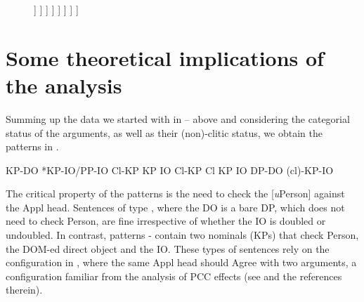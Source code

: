 \documentclass[output=paper,colorlinks,citecolor=brown,nonflat]{./langscibook}
\begin{document}
\begin{figure}%
	\begin{forest}
		[PersP
			[Pers
			]
			[\textit{v}P
				[KP\textsubscript{Theme}
				]
				[\textit{v}P
					[DP\textsubscript{Agent}
					]
					[\textit{v}'
						[\textit{v}
						]
						[V\textsubscript{Appl}P
								[KP\textsubscript{Theme}
								]
								[V'\textsubscript{Appl}
									[V\textsubscript{Appl}
									]
									[VP
										[KP\textsubscript{Goal}
										]
									]
								]
						]
						]
					]
				]
			]
		]
	\end{forest}
	\caption{\label{fig:cornilescu:13} \missingcaption}
\end{figure}


\section{Some theoretical implications of the analysis}\label{sec:cornilescu:6} %

Summing up the data we started with in  –  above and considering the categorial status of the arguments, as well as their (non)-clitic status, we obtain the patterns in . 

\ea%
   \label{ex:cornilescu:35}
   \ea KP-DO \hspace{1cm} *KP-IO/PP-IO \label{ex:cornilescu:35a}
   \ex Cl-KP \hspace{1cm} KP IO \label{ex:cornilescu:35b}
   \ex Cl-KP \hspace{1cm} Cl KP IO \label{ex:cornilescu:35c}
    \label{ex:cornilescu:35d}
   \ex DP-DO \hspace{1cm} (cl)-KP-IO \label{ex:cornilescu:35e}
   \z
   \z

The critical property of the patterns is the need to check the [\textit{u}Person] against the Appl head. Sentences of type , where the DO is a bare DP, which does not need to check Person, are fine irrespective of whether the IO is doubled or undoubled. In contrast, patterns - contain two nominals (KPs) that check Person, the DOM-ed direct object and the IO. These types of sentences rely on the configuration in , where the same Appl head should Agree with two arguments, a configuration familiar from the analysis of PCC effects (see  and the references therein). 
\end{document}
